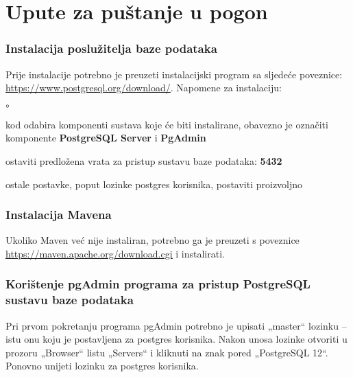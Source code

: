 {			\eject 
		
		\section{Upute za puštanje u pogon}
		
			\subsubsection{Instalacija poslužitelja baze podataka}
		
			Prije instalacije potrebno je preuzeti instalacijski program sa sljedeće poveznice:
				\href{https://www.postgresql.org/download/}{\underline{https://www.postgresql.org/download/}}.
			\newline\newline
			Napomene za instalaciju:
			\begin{list}{$\circ$}{}
				\item  kod odabira komponenti sustava koje će biti
				instalirane, obavezno je označiti komponente
	 			\textbf{PostgreSQL Server} i \textbf{PgAdmin} 

				\item  ostaviti predložena vrata za pristup
				sustavu baze podataka: \textbf{5432}
				\item  ostale postavke, poput lozinke postgres korisnika, postaviti proizvoljno
			\end{list}
		
			\subsubsection{Instalacija Mavena}
			Ukoliko Maven već nije instaliran, potrebno ga je preuzeti s poveznice\newline
			\href{https://maven.apache.org/download.cgi}{\underline{https://maven.apache.org/download.cgi}} i instalirati.
		
			\subsubsection{Korištenje pgAdmin programa za pristup PostgreSQL sustavu baze podataka}
			
			Pri prvom pokretanju programa pgAdmin potrebno je upisati
			„master“ lozinku – istu onu koju je postavljena za postgres korisnika.
			Nakon unosa lozinke otvoriti u prozoru „Browser“ listu
			„Servers“ i kliknuti na znak pored „PostgreSQL 12“.
			Ponovno unijeti lozinku za postgres korisnika.
			
}
